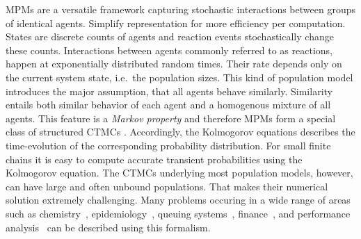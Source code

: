 \Acfp{MPM} are a versatile framework capturing stochastic interactions between groups of identical agents.
Simplify representation for more efficiency per computation.
States are discrete counts of agents and reaction events stochastically change these counts.
Interactions between agents commonly referred to as reactions, happen at exponentially distributed random times. 
Their rate depends only on the current system state, i.e.\ the population sizes.
This kind of population model introduces the major assumption, that all agents behave similarly.
Similarity entails both similar behavior of each agent and a homogenous mixture of all agents.
This feature is a \emph{Markov property} and
therefore \acp{MPM} form a special class of structured \acp{CTMC} \parencite{anderson2012continuous}.
Accordingly, the Kolmogorov equations describes the time-evolution of the corresponding probability distribution.
For small finite chains it is easy to compute accurate transient probabilities using the Kolmogorov equation.
The \acp{CTMC} underlying most population models, however, can have large and often unbound populations.
That makes their numerical solution extremely challenging.
Many problems occuring in a wide range of areas such as chemistry~\parencite{gillespie1977exact}, epidemiology~\parencite{mode2000stochastic},    queuing systems~\parencite{breuer2003markov}, finance~\parencite{pardoux2008markov}, and performance analysis~\parencite{bortolussi2013continuous,gast2019} can be described using this formalism.

